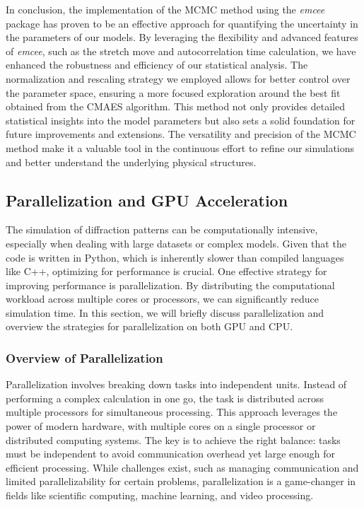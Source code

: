 \FloatBarrier

In conclusion, the implementation of the MCMC method using the \textit{emcee} package has proven to be an effective approach for quantifying the uncertainty in the parameters of our models. By leveraging the flexibility and advanced features of \textit{emcee}, such as the stretch move and autocorrelation time calculation, we have enhanced the robustness and efficiency of our statistical analysis. The normalization and rescaling strategy we employed allows for better control over the parameter space, ensuring a more focused exploration around the best fit obtained from the CMAES algorithm. This method not only provides detailed statistical insights into the model parameters but also sets a solid foundation for future improvements and extensions. The versatility and precision of the MCMC method make it a valuable tool in the continuous effort to refine our simulations and better understand the underlying physical structures.


\subsection{Parallelization and GPU Acceleration}

The simulation of diffraction patterns can be computationally intensive, especially when dealing with large datasets or complex models. Given that the code is written in Python, which is inherently slower than compiled languages like C++, optimizing for performance is crucial. One effective strategy for improving performance is parallelization. By distributing the computational workload across multiple cores or processors, we can significantly reduce simulation time. In this section, we will briefly discuss parallelization and overview the strategies for parallelization on both GPU and CPU.

\medskip

\subsubsection{Overview of Parallelization}

Parallelization involves breaking down tasks into independent units. Instead of performing a complex calculation in one go, the task is distributed across multiple processors for simultaneous processing. This approach leverages the power of modern hardware, with multiple cores on a single processor or distributed computing systems. The key is to achieve the right balance: tasks must be independent to avoid communication overhead yet large enough for efficient processing. While challenges exist, such as managing communication and limited parallelizability for certain problems, parallelization is a game-changer in fields like scientific computing, machine learning, and video processing.

